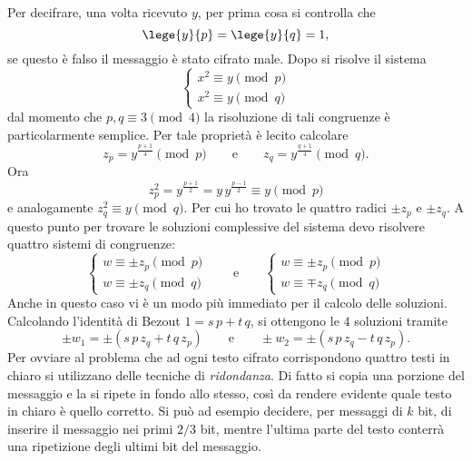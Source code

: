 	Per decifrare, una volta ricevuto \(y\), per prima cosa si controlla che
		\[
		\lege{y}{p} = \lege{y}{q} = 1,
		\]
	se questo è falso il messaggio è stato cifrato male. Dopo si risolve il sistema
		\[
		\begin{cases}
		x^2 \equiv y \pmod{p}\\
		x^2 \equiv y \pmod{q}
		\end{cases}
		\]
	dal momento che \(p,q\equiv 3 \pmod{4}\) la risoluzione di tali congruenze è particolarmente semplice. Per tale proprietà è lecito calcolare
		\[
		z_p = y^{\frac{p+1}{4}}\pmod{p} \qquad\text{e}\qquad z_q = y^{\frac{q+1}{4}} \pmod{q}.
		\]
	Ora
		\[
		z_p^2 = y^{\frac{p+1}{2}} = y\,y^{\frac{p-1}{2}} \equiv y \pmod{p}
		\]
	e analogamente \(z_q^2 \equiv y \pmod{q}\). Per cui ho trovato le quattro radici \(\pm z_p\) e \(\pm z_q\). A questo punto per trovare le soluzioni complessive del sistema devo risolvere quattro sistemi di congruenze:
		\[
		\begin{cases}
		w \equiv \pm z_p \pmod{p}\\
		w \equiv \pm z_q \pmod{q}
		\end{cases}
		\qquad\text{e}\qquad
		\begin{cases}
		w \equiv \pm z_p \pmod{p}\\
		w \equiv \mp z_q \pmod{q}
		\end{cases}
		\]
	Anche in questo caso vi è un modo più immediato per il calcolo delle soluzioni.
	Calcolando l'identità di Bezout \(1=s\,p+t\,q\), si ottengono le \(4\) soluzioni tramite
		\[
		\pm w_1 = \pm(s\,p\,z_q + t\,q\,z_p) \qquad\text{e}\qquad \pm w_2 = \pm(s\,p\,z_q - t\,q\,z_p).
		\]
	Per ovviare al problema che ad ogni testo cifrato corrispondono quattro testi in chiaro si utilizzano delle tecniche di \emph{ridondanza}. Di fatto si copia una porzione del messaggio e la si ripete in fondo allo stesso, così da rendere evidente quale testo in chiaro è quello corretto.
	Si può ad esempio decidere, per messaggi di \(k\) bit, di inserire il messaggio nei primi \(2/3\) bit, mentre l'ultima parte del testo conterrà una ripetizione degli ultimi bit del messaggio.

